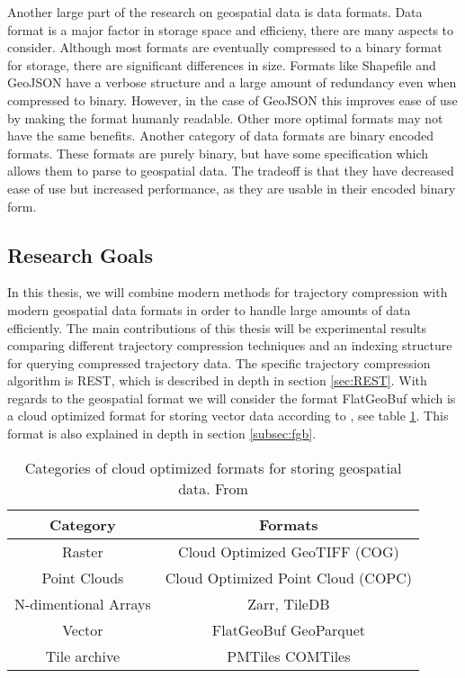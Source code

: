 Another large part of the research on geospatial data is data formats. Data format is a major factor in storage space and efficieny, there are many aspects to consider. Although most formats are eventually compressed to a binary format for storage, there are significant differences in size. Formats like Shapefile and GeoJSON have a verbose structure and a large amount of redundancy even when compressed to binary. However, in the case of GeoJSON this improves ease of use by making the format humanly readable. Other more optimal formats may not have the same benefits. Another category of data formats are binary encoded formats. These formats are purely binary, but have some specification which allows them to parse to geospatial data. The tradeoff is that they have decreased ease of use but increased performance, as they are usable in their encoded binary form.

\subsection{Research Goals}
In this thesis, we will combine modern methods for trajectory compression with modern geospatial data formats in order to handle large amounts of data efficiently. The main contributions of this thesis will be experimental results comparing different trajectory compression techniques and an indexing structure for querying compressed trajectory data. The specific trajectory compression algorithm is REST, which is described in depth in section \ref{sec:REST}. With regards to the geospatial format we will consider the format FlatGeoBuf which is a cloud optimized format for storing vector data according to \cite{tremmel2023comtiles}, see table \ref{cloud_native_formats}. This format is also explained in depth in section \ref{subsec:fgb}.

\begin{table}[h]
    \centering
    \begin{tabular}{ |c|c| }
        \hline
        \bf{Category}        & \bf{Formats}                       \\
        \hline
        Raster               & Cloud Optimized GeoTIFF (COG)      \\
        \hline
        Point Clouds         & Cloud Optimized Point Cloud (COPC) \\
        \hline
        N-dimentional Arrays & Zarr, TileDB                       \\
        \hline
        Vector               & FlatGeoBuf GeoParquet              \\
        \hline
        Tile archive         & PMTiles COMTiles                   \\
        \hline
    \end{tabular}
    \caption{Categories of cloud optimized formats for storing geospatial data. From \cite{tremmel2023comtiles}}
    \label{cloud_native_formats}
\end{table}


